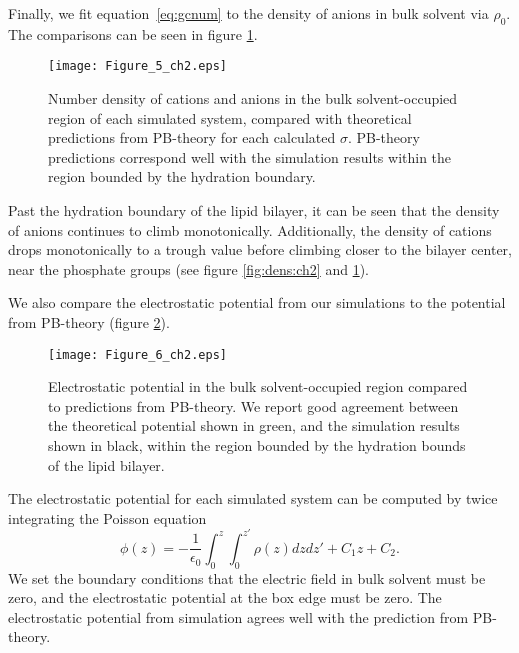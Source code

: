 Finally, we fit equation~\ref{eq:gcnum} to the density of anions in 
bulk solvent via $\rho_0$. The comparisons
can be seen in figure \ref{fig:catgcdens:ch2}.
\begin{figure}
    \caption[Ion number densities]{Number density of cations and anions in the bulk solvent-occupied region of each
    simulated system, compared with theoretical predictions from PB-theory for each calculated $\sigma$. PB-theory predictions
    correspond well with the simulation results within the region bounded by the hydration boundary.}
    \label{fig:catgcdens:ch2}
    \texttt{[image: Figure\_5\_ch2.eps]}
\end{figure}
Past the hydration boundary of the lipid bilayer, it can be seen that the density of anions continues 
to climb monotonically. Additionally, the density of cations 
drops monotonically to a trough value before climbing closer to the bilayer center, near the phosphate groups 
(see figure \ref{fig:dens:ch2} and \ref{fig:catgcdens:ch2}). 


We also compare {the} 
electrostatic potential from our simulations 
to the potential from PB-theory 
(figure \ref{fig:potgc:ch2}). 
\begin{figure}
    \caption[Electrostatic potential in bulk solvent]{Electrostatic potential in the bulk solvent-occupied region compared to predictions from PB-theory. We report good
    agreement between the theoretical potential shown in green, and the simulation results shown in black, within the region bounded by the hydration
    bounds of the lipid bilayer.}
    \label{fig:potgc:ch2}
    \texttt{[image: Figure\_6\_ch2.eps]}
\end{figure}
The electrostatic potential for each simulated system can be computed 
by twice integrating the Poisson equation 
\begin{equation}
    \phi(z)=-\frac{1}{\epsilon_0}\int_{0}^{z}\int_{0}^{z'}\rho(z) dz dz' + C_1z + C_2\text{.}
    \label{eq:poissonint}
\end{equation}
We set the boundary conditions that
the electric field in bulk solvent must be zero, and the electrostatic potential at the box edge must be zero.
The electrostatic potential from simulation agrees well with the prediction from PB-theory.


